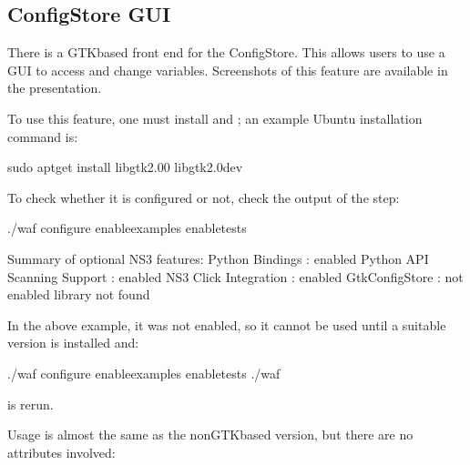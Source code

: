 \documentclass[letterpaper,10pt,english]{sphinxmanual}
\renewcommand{\sphinxcode}[1]{\texttt{\small{#1}}}
\begin{document}
\subsection{ConfigStore GUI}
\label{\detokenize{attributes:configstore-gui}}
There is a GTK\sphinxhyphen{}based front end for the ConfigStore.  This allows users to use a
GUI to access and change variables.  Screenshots of this feature are available
in the 
presentation.

To use this feature, one must install \sphinxcode{} and \sphinxcode{}; an example
Ubuntu installation command is:

\begin{sphinxVerbatim}[commandchars=\\\{\}]
\PYGZdl{} sudo apt\PYGZhy{}get install libgtk2.0\PYGZhy{}0 libgtk2.0\PYGZhy{}dev
\end{sphinxVerbatim}

To check whether it is configured or not, check the output of the step:

\begin{sphinxVerbatim}[commandchars=\\\{\}]
\PYGZdl{} ./waf configure \PYGZhy{}\PYGZhy{}enable\PYGZhy{}examples \PYGZhy{}\PYGZhy{}enable\PYGZhy{}tests

\PYGZhy{}\PYGZhy{}\PYGZhy{}\PYGZhy{} Summary of optional NS\PYGZhy{}3 features:
Python Bindings               : enabled
Python API Scanning Support   : enabled
NS\PYGZhy{}3 Click Integration        : enabled
GtkConfigStore                : not enabled library  not found
\end{sphinxVerbatim}

In the above example, it was not enabled, so it cannot be used until a suitable
version is installed and:

\begin{sphinxVerbatim}[commandchars=\\\{\}]
\PYGZdl{} ./waf configure \PYGZhy{}\PYGZhy{}enable\PYGZhy{}examples \PYGZhy{}\PYGZhy{}enable\PYGZhy{}tests
\PYGZdl{} ./waf
\end{sphinxVerbatim}

is rerun.

Usage is almost the same as the non\sphinxhyphen{}GTK\sphinxhyphen{}based version, but there
are no \sphinxcode{} attributes involved:
\end{document}
